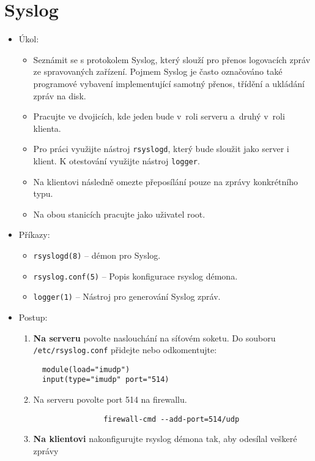 \section{Syslog}
  \begin{itemize}
    \item Úkol: 
    \begin{itemize}
      \item Seznámit se s protokolem Syslog, který slouží pro přenos
      logovacích zpráv ze spravovaných zařízení. Pojmem Syslog je často označováno také
      programové vybavení implementující samotný přenos, třídění a ukládání zpráv na disk.
      \item Pracujte ve dvojicích, kde jeden bude v~roli serveru a~druhý v~roli klienta.
      \item Pro práci využijte nástroj {\tt rsyslogd}, který bude sloužit jako server i klient.
      K otestování využijte nástroj {\tt logger}.
      \item Na klientovi následně omezte přeposílání pouze na zprávy konkrétního typu.
      \item Na obou stanicích pracujte jako uživatel root.
    \end{itemize}
    \item Příkazy:
       \begin{itemize}
            \item {\tt rsyslogd(8)} -- démon pro Syslog.
            \item {\tt rsyslog.conf(5)} -- Popis konfigurace rsyslog démona.
            \item {\tt logger(1)} -- Nástroj pro generování Syslog zpráv.
        \end{itemize}
    \item Postup:
       \begin{enumerate}
            \item {\bf Na serveru} povolte naslouchání na síťovém soketu. Do souboru {\tt /etc/rsyslog.conf} přidejte nebo odkomentujte:
\begin{verbatim}
  module(load="imudp")
  input(type="imudp" port="514)
\end{verbatim}
            \item Na serveru povolte port 514 na firewallu.
            \begin{verbatim}
                firewall-cmd --add-port=514/udp
            \end{verbatim}
            \item {\bf Na klientovi} nakonfigurujte rsyslog démona tak, aby odesílal veškeré zprávy

\end{enumerate}
\end{itemize}
